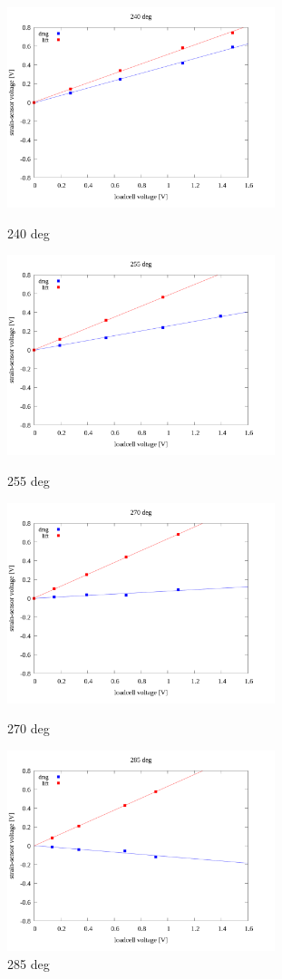 \documentclass[twocolumn,a4j]{jsarticle}
\begin{document}
\begin{figure}[htbp]
    \footnotesize
    \begin{center}
        \includegraphics[width=78mm]{../images/linear/240_linear.png}
        \caption{240 deg}
        \includegraphics[width=78mm]{../images/linear/255_linear.png}
        \caption{255 deg}
        \includegraphics[width=78mm]{../images/linear/270_linear.png}
        \caption{270 deg}
        \includegraphics[width=78mm]{../images/linear/285_linear.png}
        \caption{285 deg}
    \end{center}
\end{figure}
\end{document}
